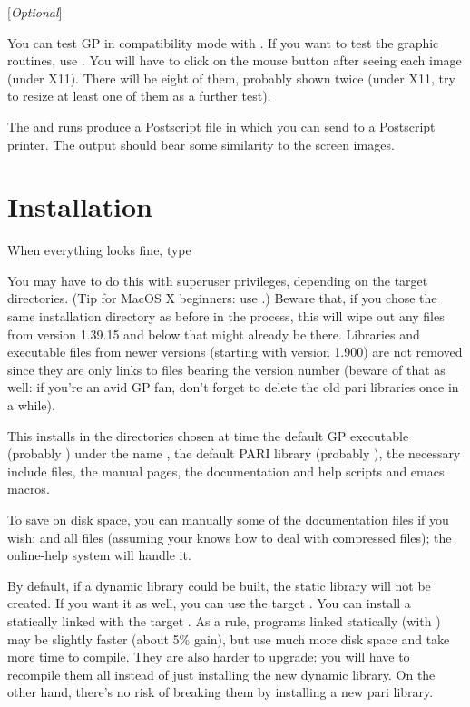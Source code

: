  [{\sl Optional\/}]

You can test GP in compatibility mode with . If you
want to test the graphic routines, use . You will
have to click on the mouse button after seeing each image (under X11).
There will be eight of them, probably shown twice (under X11, try to resize
at least one of them as a further test).

The  and  runs produce a Postscript
file  in  which you can send to a Postscript
printer. The output should bear some similarity to the screen images.

\section{Installation} When everything looks fine, type


\noindent You may have to do this with superuser privileges, depending on
the target directories. (Tip for MacOS X beginners: use
.) Beware that, if you chose the same installation
directory as before in the  process, this will wipe out any
files from version 1.39.15 and below that might already be there. Libraries
and executable files from newer versions (starting with version 1.900) are
not removed since they are only links to files bearing the version number
(beware of that as well: if you're an avid GP fan, don't forget to delete the
old pari libraries once in a while).

This installs in the directories chosen at  time the default
GP executable (probably ) under the name , the default
PARI library (probably ), the necessary include files, the
manual pages, the documentation and help scripts and emacs macros.

To save on disk space, you can manually  some of the documentation
files if you wish:  and all  files (assuming your
 knows how to deal with compressed files); the online-help system
will handle it.

By default, if a dynamic library  could be built, the static
library  will not be created. If you want it as well, you can
use the target . You can install a statically
linked  with the target . As a rule,
programs linked statically (with ) may be slightly faster
(about 5\% gain), but use much more disk space and take more time to compile.
They are also harder to upgrade: you will have to recompile them all instead
of just installing the new dynamic library. On the other hand, there's no
risk of breaking them by installing a new pari library.

